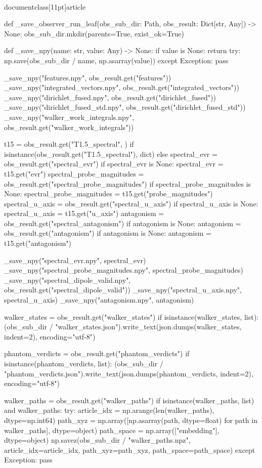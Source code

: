 \\documentclass[11pt]{article}
\begin{document}
\begin{CodeBlock}
def _save_observer_run_leaf(obs_sub_dir: Path, obs_result: Dict[str, Any]) -> None:
    obs_sub_dir.mkdir(parents=True, exist_ok=True)

    def _save_npy(name: str, value: Any) -> None:
        if value is None:
            return
        try:
            np.save(obs_sub_dir / name, np.asarray(value))
        except Exception:
            pass

    _save_npy("features.npy", obs_result.get("features"))
    _save_npy("integrated_vectors.npy", obs_result.get("integrated_vectors"))
    _save_npy("dirichlet_fused.npy", obs_result.get("dirichlet_fused"))
    _save_npy("dirichlet_fused_std.npy", obs_result.get("dirichlet_fused_std"))
    _save_npy("walker_work_integrals.npy", obs_result.get("walker_work_integrals"))

    t15 = obs_result.get("T1.5_spectral", {}) if isinstance(obs_result.get("T1.5_spectral"), dict) else {}
    spectral_evr = obs_result.get("spectral_evr")
    if spectral_evr is None:
        spectral_evr = t15.get("evr")
    spectral_probe_magnitudes = obs_result.get("spectral_probe_magnitudes")
    if spectral_probe_magnitudes is None:
        spectral_probe_magnitudes = t15.get("probe_magnitudes")
    spectral_u_axis = obs_result.get("spectral_u_axis")
    if spectral_u_axis is None:
        spectral_u_axis = t15.get("u_axis")
    antagonism = obs_result.get("spectral_antagonism")
    if antagonism is None:
        antagonism = obs_result.get("antagonism")
    if antagonism is None:
        antagonism = t15.get("antagonism")

    _save_npy("spectral_evr.npy", spectral_evr)
    _save_npy("spectral_probe_magnitudes.npy", spectral_probe_magnitudes)
    _save_npy("spectral_dipole_valid.npy", obs_result.get("spectral_dipole_valid"))
    _save_npy("spectral_u_axis.npy", spectral_u_axis)
    _save_npy("antagonism.npy", antagonism)

    walker_states = obs_result.get("walker_states")
    if isinstance(walker_states, list):
        (obs_sub_dir / "walker_states.json").write_text(json.dumps(walker_states, indent=2), encoding="utf-8")

    phantom_verdicts = obs_result.get("phantom_verdicts")
    if isinstance(phantom_verdicts, list):
        (obs_sub_dir / "phantom_verdicts.json").write_text(json.dumps(phantom_verdicts, indent=2), encoding="utf-8")

    walker_paths = obs_result.get("walker_paths")
    if isinstance(walker_paths, list) and walker_paths:
        try:
            article_idx = np.arange(len(walker_paths), dtype=np.int64)
            path_xyz = np.array([np.asarray(path, dtype=float) for path in walker_paths], dtype=object)
            path_space = np.array(["embedding"], dtype=object)
            np.savez(obs_sub_dir / "walker_paths.npz", article_idx=article_idx, path_xyz=path_xyz, path_space=path_space)
        except Exception:
            pass



\end{CodeBlock}
\end{document}
